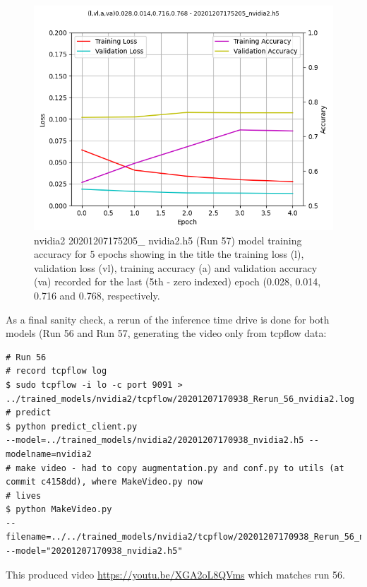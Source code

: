 \begin{figure}[ht]
 \centering 
 \includegraphics[width=\textwidth]{Figures/20201207175205_nvidia2_accuracy.png}
 \caption{nvidia2 20201207175205\_ nvidia2.h5 (Run 57) model training accuracy for 5 epochs showing in the title the training loss (l), validation loss (vl), training accuracy (a) and validation accuracy (va) recorded for the last (5th - zero indexed) epoch (0.028, 0.014, 0.716 and 0.768, respectively.}
 \label{fig:20201207175205_nvidia2_accuracy} 
\end{figure}

As a final sanity check, a rerun of the inference time drive is done for both models (Run 56 and Run 57, generating the video only from tcpflow data:
\begin{verbatim}
# Run 56
# record tcpflow log
$ sudo tcpflow -i lo -c port 9091 >
../trained_models/nvidia2/tcpflow/20201207170938_Rerun_56_nvidia2.log
# predict
$ python predict_client.py 
--model=../trained_models/nvidia2/20201207170938_nvidia2.h5 --modelname=nvidia2
# make video - had to copy augmentation.py and conf.py to utils (at commit c4158dd), where MakeVideo.py now
# lives
$ python MakeVideo.py 
--filename=../../trained_models/nvidia2/tcpflow/20201207170938_Rerun_56_nvidia2.log
--model="20201207170938_nvidia2.h5"
\end{verbatim}
This produced video \url{https://youtu.be/XGA2oL8QVms} which matches run 56.  
  
